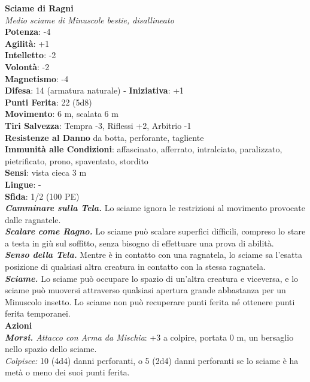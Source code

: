 \begin{multicols}{2}
\medskip\textbf{Sciame di Ragni}\\
\emph{Medio sciame di Minuscole bestie, disallineato}\\
\textbf{Potenza}: -4\\
\textbf{Agilità}: +1\\
\textbf{Intelletto}: -2\\
\textbf{Volontà}: -2\\
\textbf{Magnetismo}: -4\\
\textbf{Difesa}: 14 (armatura naturale) - \textbf{Iniziativa}: +1\\
\textbf{Punti Ferita}: 22 (5d8)\\
\textbf{Movimento}: 6 m, scalata 6 m\\
\textbf{Tiri Salvezza}: Tempra -3, Riflessi +2, Arbitrio -1\\
\textbf{Resistenze al Danno} da botta, perforante, tagliente\\
\textbf{Immunità alle Condizioni}: affascinato, afferrato, intralciato, paralizzato, pietrificato, prono, spaventato, stordito\\
\textbf{Sensi}: vista cieca 3 m\\
\textbf{Lingue}: -\\
\textbf{Sfida}: 1/2 (100 PE)\smallskip\\
\emph{\textbf{Camminare sulla Tela.}} Lo sciame ignora le restrizioni al movimento provocate dalle ragnatele.\\
\emph{\textbf{Scalare come Ragno.}} Lo sciame può scalare superfici difficili, compreso lo stare a testa in giù sul soffitto, senza bisogno di effettuare una prova di abilità.\\
\emph{\textbf{Senso della Tela.}} Mentre è in contatto con una ragnatela, lo sciame sa l'esatta posizione di qualsiasi altra creatura in contatto con la stessa ragnatela.\\
\emph{\textbf{Sciame.}} Lo sciame può occupare lo spazio di un'altra creatura e viceversa, e lo sciame può muoversi attraverso qualsiasi apertura grande abbastanza per un Minuscolo insetto. Lo sciame non può recuperare punti ferita né ottenere punti ferita temporanei.\\
\smallskip\textbf{Azioni}\\
\emph{\textbf{Morsi.} Attacco con Arma da Mischia}: +3 a colpire, portata 0 m, un bersaglio nello spazio dello sciame.\\
\emph{Colpisce:} 10 (4d4) danni perforanti, o 5 (2d4) danni perforanti se lo sciame è ha metà o meno dei suoi punti ferita.\\


\end{multicols}
